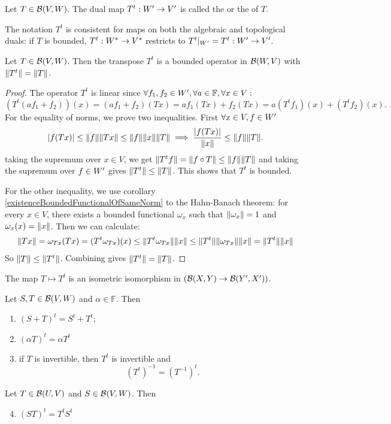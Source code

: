 \begin{definition}
Let $T\in\operatorname{\mathcal{B}}(V,W)$. The dual map $T^t: {W}^\prime\to {V}^\prime$ is called the  or the  of $T$.
\end{definition}
The notation $T^t$ is consistent for maps on both the algebraic and topological duals: if $T$ is bounded, $T^t:{W}^*\to {V}^*$ restricts to $T^t|_{{W}^\prime} = T^t:{W}^\prime\to {V}^\prime$.

\begin{proposition}
Let $T\in\operatorname{\mathcal{B}}(V,W)$. Then the transpose $T^t$ is a bounded operator in $\operatorname{\mathcal{B}}(W,V)$ with $\lVert T^t\rVert = \lVert T\rVert$.
\end{proposition}
\begin{proof}
The operator $T^t$ is linear since $\forall f_1,f_2\in {W}^\prime, \forall a\in\mathbb{F}, \forall x\in V:$
\[ (T^t(af_1 + f_2))(x) = (af_1 + f_2)(Tx) = af_1(Tx) + f_2(Tx) = a(T^tf_1)(x) + (T^tf_2)(x). \]
For the equality of norms, we prove two inequalities. First $\forall x\in V, f\in {W}^\prime$
\[ |f(Tx)|\leq \lVert f\rVert\lVert Tx\rVert\leq \lVert f\rVert\lVert x\rVert\lVert T\rVert \implies \frac{|f(Tx)|}{\lVert x\rVert} \leq \lVert f\rVert\lVert T\rVert. \]
taking the supremum over $x\in V$, we get $\lVert T^tf\rVert = \lVert f\circ T\rVert\leq \lVert f\rVert\lVert T\rVert$ and taking the supremum over $f\in {W}^\prime$ gives $\lVert T^t\rVert\leq \lVert T\rVert$. This shows that $T^t$ is bounded.

For the other inequality, we use corollary \ref{existenceBoundedFunctionalOfSameNorm} to the Hahn-Banach theorem: for every $x\in V$, there exists a bounded functional $\omega_x$ such that $\lVert\omega_x\rVert=1$ and $\omega_x(x) = \lVert x\rVert$. Then we can calculate:
\begin{align*}
\lVert Tx\rVert = \omega_{Tx}(Tx) = (T^t\omega_{Tx})(x) \leq \lVert T^t\omega_{Tx}\rVert\lVert x\rVert \leq \lVert T^t\rVert\lVert\omega_{Tx}\rVert\lVert x\rVert = \lVert T^t\rVert\lVert x\rVert
\end{align*}
So $\lVert T\rVert\leq\lVert T^t\rVert$. Combining gives $\lVert T^t\rVert=\lVert T\rVert$.
\end{proof}
\begin{corollary}
The map $T\mapsto T^t$ is an isometric isomorphism in $(\operatorname{\mathcal{B}}(X,Y)\to \operatorname{\mathcal{B}}({Y}^\prime, {X}^\prime))$.
\end{corollary}

\begin{lemma}
Let $S,T\in\operatorname{\mathcal{B}}(V,W)$ and $\alpha\in\mathbb{F}$. Then
\begin{enumerate}
\item $(S+T)^t = S^t+T^t$;
\item $(\alpha T)^t = \alpha T^t$
\item if $T$ is invertible, then $T^t$ is invertible and
\[ (T^t)^{-1} = (T^{-1})^t. \]
\end{enumerate}
Let $T\in\operatorname{\mathcal{B}}(U,V)$ and $S\in\operatorname{\mathcal{B}}(V,W)$. Then
\begin{enumerate}
\setcounter{enumi}{3}
\item $(ST)^t = T^tS^t$
\end{enumerate}
\end{lemma}


